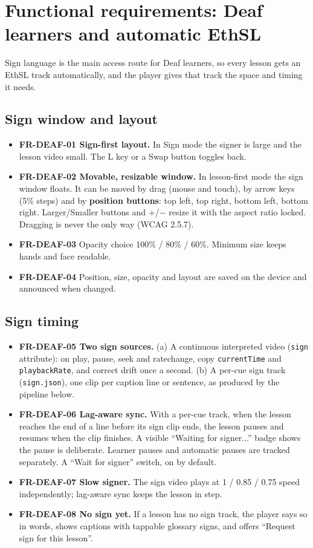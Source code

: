 \documentclass[11pt,a4paper]{article}
\newcommand{\code}[1]{\texttt{#1}}
\newcommand{\req}[1]{\textbf{#1}}
\begin{document}
\section{Functional requirements: Deaf learners and automatic EthSL}

Sign language is the main access route for Deaf learners, so every lesson gets an EthSL track automatically, and the player gives that track the space and timing it needs.

\subsection{Sign window and layout}
\begin{itemize}
  \item \req{FR-DEAF-01 Sign-first layout.} In Sign mode the signer is large and the lesson video small. The L key or a Swap button toggles back.
  \item \req{FR-DEAF-02 Movable, resizable window.} In lesson-first mode the sign window floats. It can be moved by drag (mouse and touch), by arrow keys (5\% steps) and by \textbf{position buttons}: top left, top right, bottom left, bottom right. Larger/Smaller buttons and +/$-$ resize it with the aspect ratio locked. Dragging is never the only way (WCAG 2.5.7).
  \item \req{FR-DEAF-03} Opacity choice 100\% / 80\% / 60\%. Minimum size keeps hands and face readable.
  \item \req{FR-DEAF-04} Position, size, opacity and layout are saved on the device and announced when changed.
\end{itemize}

\subsection{Sign timing}
\begin{itemize}
  \item \req{FR-DEAF-05 Two sign sources.} (a) A continuous interpreted video (\code{sign} attribute): on play, pause, seek and ratechange, copy \code{currentTime} and \code{playbackRate}, and correct drift once a second. (b) A per-cue sign track (\code{sign.json}), one clip per caption line or sentence, as produced by the pipeline below.
  \item \req{FR-DEAF-06 Lag-aware sync.} With a per-cue track, when the lesson reaches the end of a line before its sign clip ends, the lesson pauses and resumes when the clip finishes. A visible ``Waiting for signer...'' badge shows the pause is deliberate. Learner pauses and automatic pauses are tracked separately. A ``Wait for signer'' switch, on by default.
  \item \req{FR-DEAF-07 Slow signer.} The sign video plays at 1 / 0.85 / 0.75 speed independently; lag-aware sync keeps the lesson in step.
  \item \req{FR-DEAF-08 No sign yet.} If a lesson has no sign track, the player says so in words, shows captions with tappable glossary signs, and offers ``Request sign for this lesson''.
\end{itemize}
\end{document}
